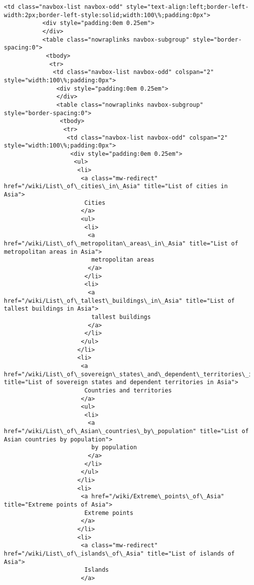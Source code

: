 \documentclass[11pt]{article}
\begin{document}
\begin{Verbatim}[commandchars=\\\{\}]
          <td class="navbox-list navbox-odd" style="text-align:left;border-left-width:2px;border-left-style:solid;width:100\%;padding:0px">
           <div style="padding:0em 0.25em">
           </div>
           <table class="nowraplinks navbox-subgroup" style="border-spacing:0">
            <tbody>
             <tr>
              <td class="navbox-list navbox-odd" colspan="2" style="width:100\%;padding:0px">
               <div style="padding:0em 0.25em">
               </div>
               <table class="nowraplinks navbox-subgroup" style="border-spacing:0">
                <tbody>
                 <tr>
                  <td class="navbox-list navbox-odd" colspan="2" style="width:100\%;padding:0px">
                   <div style="padding:0em 0.25em">
                    <ul>
                     <li>
                      <a class="mw-redirect" href="/wiki/List\_of\_cities\_in\_Asia" title="List of cities in Asia">
                       Cities
                      </a>
                      <ul>
                       <li>
                        <a href="/wiki/List\_of\_metropolitan\_areas\_in\_Asia" title="List of metropolitan areas in Asia">
                         metropolitan areas
                        </a>
                       </li>
                       <li>
                        <a href="/wiki/List\_of\_tallest\_buildings\_in\_Asia" title="List of tallest buildings in Asia">
                         tallest buildings
                        </a>
                       </li>
                      </ul>
                     </li>
                     <li>
                      <a href="/wiki/List\_of\_sovereign\_states\_and\_dependent\_territories\_in\_Asia" title="List of sovereign states and dependent territories in Asia">
                       Countries and territories
                      </a>
                      <ul>
                       <li>
                        <a href="/wiki/List\_of\_Asian\_countries\_by\_population" title="List of Asian countries by population">
                         by population
                        </a>
                       </li>
                      </ul>
                     </li>
                     <li>
                      <a href="/wiki/Extreme\_points\_of\_Asia" title="Extreme points of Asia">
                       Extreme points
                      </a>
                     </li>
                     <li>
                      <a class="mw-redirect" href="/wiki/List\_of\_islands\_of\_Asia" title="List of islands of Asia">
                       Islands
                      </a>

\end{Verbatim}
\end{document}
